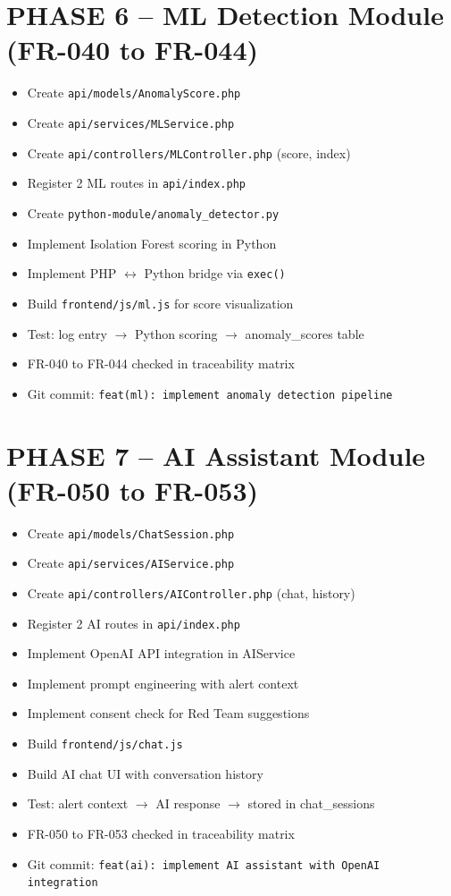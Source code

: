 \documentclass[11pt,a4paper]{article}
\newcommand{\undone}{\textcolor{helixgray}{\texttt{[ ] }}}
\newcommand{\filepath}[1]{\texttt{\small#1}}
\newcommand{\task}[2]{\item[#1] #2}
\begin{document}
\section{PHASE 6 -- ML Detection Module (FR-040 to FR-044)}

\begin{itemize}
    \task{\undone}{Create \filepath{api/models/AnomalyScore.php}}
    \task{\undone}{Create \filepath{api/services/MLService.php}}
    \task{\undone}{Create \filepath{api/controllers/MLController.php} (score, index)}
    \task{\undone}{Register 2 ML routes in \filepath{api/index.php}}
    \task{\undone}{Create \filepath{python-module/anomaly\_detector.py}}
    \task{\undone}{Implement Isolation Forest scoring in Python}
    \task{\undone}{Implement PHP $\leftrightarrow$ Python bridge via \texttt{exec()}}
    \task{\undone}{Build \filepath{frontend/js/ml.js} for score visualization}
    \task{\undone}{Test: log entry $\rightarrow$ Python scoring $\rightarrow$ anomaly\_scores table}
    \task{\undone}{FR-040 to FR-044 checked in traceability matrix}
    \task{\undone}{Git commit: \texttt{feat(ml): implement anomaly detection pipeline}}
\end{itemize}

\section{PHASE 7 -- AI Assistant Module (FR-050 to FR-053)}

\begin{itemize}
    \task{\undone}{Create \filepath{api/models/ChatSession.php}}
    \task{\undone}{Create \filepath{api/services/AIService.php}}
    \task{\undone}{Create \filepath{api/controllers/AIController.php} (chat, history)}
    \task{\undone}{Register 2 AI routes in \filepath{api/index.php}}
    \task{\undone}{Implement OpenAI API integration in AIService}
    \task{\undone}{Implement prompt engineering with alert context}
    \task{\undone}{Implement consent check for Red Team suggestions}
    \task{\undone}{Build \filepath{frontend/js/chat.js}}
    \task{\undone}{Build AI chat UI with conversation history}
    \task{\undone}{Test: alert context $\rightarrow$ AI response $\rightarrow$ stored in chat\_sessions}
    \task{\undone}{FR-050 to FR-053 checked in traceability matrix}
    \task{\undone}{Git commit: \texttt{feat(ai): implement AI assistant with OpenAI integration}}
\end{itemize}
\end{document}
